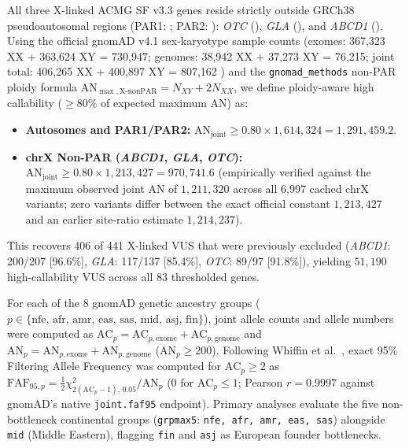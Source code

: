\documentclass[11pt,letterpaper]{article}
\begin{document}
All three X-linked ACMG SF v3.3 genes reside strictly outside GRCh38 pseudoautosomal regions (PAR1: ; PAR2: ): \textit{OTC} (), \textit{GLA} (), and \textit{ABCD1} (). Using the official gnomAD v4.1 sex-karyotype sample counts (exomes: 367,323 XX + 363,624 XY = 730,947; genomes: 38,942 XX + 37,273 XY = 76,215; joint total: 406,265 XX + 400,897 XY = 807,162 \citep{gnomadv41sex2024}) and the \texttt{gnomad\_methods} non-PAR ploidy formula $\mathrm{AN}_{\max,\text{X-nonPAR}} = N_{XY} + 2 N_{XX}$, we define ploidy-aware high callability ($\ge 80\%$ of expected maximum AN) as:
\begin{itemize}
  \item \textbf{Autosomes and PAR1/PAR2:} $\mathrm{AN}_{\text{joint}} \ge 0.80 \times 1,614,324 = 1,291,459.2$.
  \item \textbf{chrX Non-PAR (\textit{ABCD1}, \textit{GLA}, \textit{OTC}):} $\mathrm{AN}_{\text{joint}} \ge 0.80 \times 1,213,427 = 970,741.6$ (empirically verified against the maximum observed joint AN of $1,211,320$ across all 6,997 cached chrX variants; zero variants differ between the exact official constant $1,213,427$ and an earlier site-ratio estimate $1,214,237$).
\end{itemize}
This recovers 406 of 441 X-linked VUS that were previously excluded (\textit{ABCD1}: 200/207 [96.6\%], \textit{GLA}: 117/137 [85.4\%], \textit{OTC}: 89/97 [91.8\%]), yielding $51,190$ high-callability VUS across all 83 thresholded genes.

For each of the 8 gnomAD genetic ancestry groups ($p\in\{\text{nfe, afr, amr, eas, sas, mid, asj, fin}\}$), joint allele counts and allele numbers were computed as $\mathrm{AC}_p = \mathrm{AC}_{p,\text{exome}} + \mathrm{AC}_{p,\text{genome}}$ and $\mathrm{AN}_p = \mathrm{AN}_{p,\text{exome}} + \mathrm{AN}_{p,\text{genome}}$ ($\mathrm{AN}_p\ge 200$). Following Whiffin et al.\ \citep{whiffin2017frequency}, exact 95\% Filtering Allele Frequency was computed for $\mathrm{AC}_p\ge 2$ as $\mathrm{FAF}_{95,p} = \frac{1}{2}\chi^2_{2(\mathrm{AC}_p-1),\,0.05}/\mathrm{AN}_p$ ($0$ for $\mathrm{AC}_p\le 1$; Pearson $r=0.9997$ against gnomAD's native \texttt{joint.faf95} endpoint). Primary analyses evaluate the five non-bottleneck continental groups (\texttt{grpmax5}: \texttt{nfe, afr, amr, eas, sas}) alongside \texttt{mid} (Middle Eastern), flagging \texttt{fin} and \texttt{asj} as European founder bottlenecks.
\end{document}
